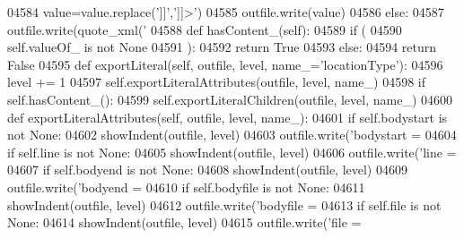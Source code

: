 \begin{DoxyCode}
{{{{{{{{{{{{{{{{{{{{{{{{{{{{{{{{{{{{{{{{{{{{{{{{{{{{{{{{{{{{{{{{{{{{{{{{{{{{{{{{{{{{{{{{{{{{{{{{{{{{{{{{{{{{{{{{{{{{{{{{{{{{{{{{{{{{{{{{{{{{{{{{{{{{{{{{{{{{{{{{{{{{{{{{{{{{{{{{{{{{{{{{{{{{{{{{{{{{{{{{{{{{{{{{{{{{{{{{{{{{{{{{{{{{{{{{{{{{{{{{{{{{{{{{{{{{{{{{{{{{{{{{{{{{{{{{{{{{{{{{{{{{{{{{{{{{{{{{{{{{{{{{{{{{{{04584             value=value.replace(\textcolor{stringliteral}{']]'},\textcolor{stringliteral}{']]>'})
04585             outfile.write(value)
04586         \textcolor{keywordflow}{else}:
04587             outfile.write(quote_xml(\textcolor{stringliteral}{'%
04588     \textcolor{keyword}{def }hasContent_(self):
04589         \textcolor{keywordflow}{if} (
04590             self.valueOf_ \textcolor{keywordflow}{is} \textcolor{keywordflow}{not} \textcolor{keywordtype}{None}
04591             ):
04592             \textcolor{keywordflow}{return} \textcolor{keyword}{True}
04593         \textcolor{keywordflow}{else}:
04594             \textcolor{keywordflow}{return} \textcolor{keyword}{False}
04595     \textcolor{keyword}{def }exportLiteral(self, outfile, level, name\_='locationType'):
04596         level += 1
04597         self.exportLiteralAttributes(outfile, level, name\_)
04598         \textcolor{keywordflow}{if} self.hasContent_():
04599             self.exportLiteralChildren(outfile, level, name\_)
04600     \textcolor{keyword}{def }exportLiteralAttributes(self, outfile, level, name\_):
04601         \textcolor{keywordflow}{if} self.bodystart \textcolor{keywordflow}{is} \textcolor{keywordflow}{not} \textcolor{keywordtype}{None}:
04602             showIndent(outfile, level)
04603             outfile.write(\textcolor{stringliteral}{'bodystart = %
04604         \textcolor{keywordflow}{if} self.line \textcolor{keywordflow}{is} \textcolor{keywordflow}{not} \textcolor{keywordtype}{None}:
04605             showIndent(outfile, level)
04606             outfile.write(\textcolor{stringliteral}{'line = %
04607         \textcolor{keywordflow}{if} self.bodyend \textcolor{keywordflow}{is} \textcolor{keywordflow}{not} \textcolor{keywordtype}{None}:
04608             showIndent(outfile, level)
04609             outfile.write(\textcolor{stringliteral}{'bodyend = %
04610         \textcolor{keywordflow}{if} self.bodyfile \textcolor{keywordflow}{is} \textcolor{keywordflow}{not} \textcolor{keywordtype}{None}:
04611             showIndent(outfile, level)
04612             outfile.write(\textcolor{stringliteral}{'bodyfile = %
04613         \textcolor{keywordflow}{if} self.file \textcolor{keywordflow}{is} \textcolor{keywordflow}{not} \textcolor{keywordtype}{None}:
04614             showIndent(outfile, level)
04615             outfile.write(\textcolor{stringliteral}{'file = %
}}}}}}}}}}}}}}}}}}}}}}}}}}}}}}}}}}}}}}}}}}}}}}}}}}}}}}}}}}}}}}}}}}}}}}}}}}}}}}}}}}}}}}}}}}}}}}}}}}}}}}}}}}}}}}}}}}}}}}}}}}}}}}}}}}}}}}}}}}}}}}}}}}}}}}}}}}}}}}}}}}}}}}}}}}}}}}}}}}}}}}}}}}}}}}}}}}}}}}}}}}}}}}}}}}}}}}}}}}}}}}}}}}}}}}}}}}}}}}}}}}}}}}}}}}}}}}}}}}}}}}}}}}}}}}}}}}}}}}}}}}}}}}}}}}}}}}}}}}}}}}}}}}}}}}}}}}}}
\end{DoxyCode}

